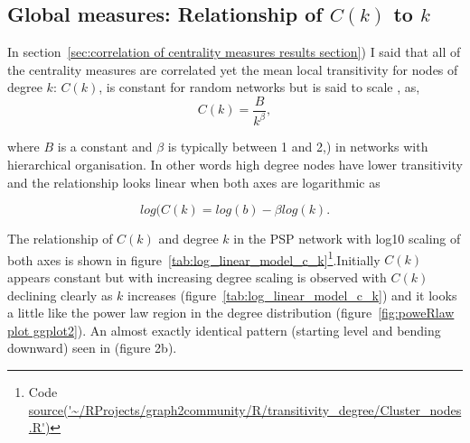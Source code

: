




  

  
\subsection{Global measures: Relationship of $C(k)$ to $k$}%
\label{sec:relationship of ck to k albert}

In section~\ref{sec:correlation of centrality measures results section}) I said that all of the centrality measures are correlated yet the mean local transitivity for nodes of degree $k$: $C(k)$, is constant for random networks but is said to scale \cite{yook2004functional},\cite{albert2005scale} as,
\begin{equation}
            C(k) = \frac{B}{k^{\beta}},
\end{equation}
\label{eq:C(k) function average transitivity and degree}

 where $B$ is a constant and $\beta$ is typically between 1 and 2\cite{albert2005scale},\cite{yook2004functional}) in networks with hierarchical organisation. In other words high degree nodes have lower transitivity and the relationship looks linear when both axes are logarithmic as 

\begin{equation}
    log(C(k) = log(b) - \beta log(k).
\end{equation}

The relationship of  $C(k)$ and degree $k$ in the PSP network with log10 scaling of both axes is shown in figure~\ref{tab:log_linear_model_c_k}\footnote{Code \url{source('~/RProjects/graph2community/R/transitivity_degree/Cluster_nodes.R')}}.Initially $C(k)$ appears constant but with increasing degree scaling is observed with $C(k)$ declining clearly as $k$ increases (figure~\ref{tab:log_linear_model_c_k}) and it looks a little like the power law region in the degree distribution (figure~\ref{fig:poweRlaw plot ggplot2}). An almost exactly identical pattern (starting level and bending downward) seen in\cite{yook2004functional}  (figure 2b). 

